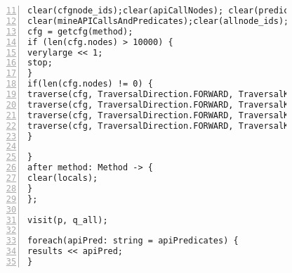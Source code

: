 \begin{figure}[ht!]
\begin{lstlisting}[numbers=left, tabsize=4, escapechar=@, caption={API Precondition Mining Analysis},label={lst:apm-code}, firstline = 11, firstnumber = 11, lastline = 59]
clear(cfgnode_ids);clear(apiCallNodes); clear(predicateExprsAtNodes);
clear(mineAPICallsAndPredicates);clear(allnode_ids);clear(cfg_dom); clear(dom_result);
cfg = getcfg(method);
if (len(cfg.nodes) > 10000) {
verylarge << 1;
stop;
}
if(len(cfg.nodes) != 0) {
traverse(cfg, TraversalDirection.FORWARD, TraversalKind.HYBRID, mineAPICallsAndPredicates);
traverse(cfg, TraversalDirection.FORWARD, TraversalKind.HYBRID, allnode_ids);
traverse(cfg, TraversalDirection.FORWARD, TraversalKind.HYBRID, cfg_dom, fixp1);
traverse(cfg, TraversalDirection.FORWARD, TraversalKind.HYBRID, dom_result);
}

}
after method: Method -> {
clear(locals);    
}
};

visit(p, q_all);

foreach(apiPred: string = apiPredicates) {
results << apiPred;                
}
\end{lstlisting}
\end{figure}